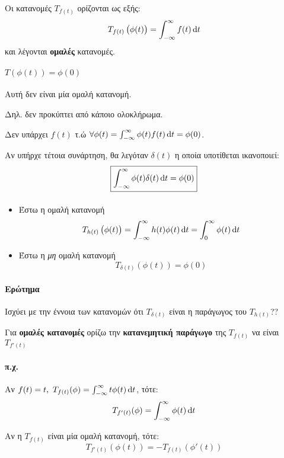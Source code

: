 \documentclass[11pt,a4paper,titlepage,final]{article}
\begin{document}
\begin{defn}{}{}
Οι κατανομές \( T_{f(t)} \) ορίζονται ως εξής:
\[
T_{f(t)}\left( \phi(t) \right) = \int_{-\infty}^\infty f(t) \dif t
\]
και λέγονται \textbf{ομαλές} κατανομές.
\end{defn}
\paragraph{\( T\left( \phi(t) \right) = \phi(0) \)}
Αυτή δεν είναι μία ομαλή κατανομή.

Δηλ. δεν προκύπτει από κάποιο ολοκλήρωμα.

Δεν υπάρχει \( f(t) \) τ.ώ \( \forall \phi(t) = \int_{-\infty}^\infty \phi(t)f(t)\dif t =\phi(0) \).

Αν υπήρχε τέτοια συνάρτηση, θα λεγόταν \( \delta(t) \) η οποία υποτίθεται ικανοποιεί:
\[
\boxed{
\int_{-\infty}^\infty \phi(t)\delta(t)\dif t = \phi(0)
}
\]

\paragraph{}

\begin{itemize}
\item Έστω η ομαλή κατανομή \[
T_{h(t)}\left(\phi(t) \right)  = \int_{-\infty}^\infty h(t)\phi(t)\dif t = \int_0^\infty \phi(t)\dif t
\]
\item Έστω η \textit{μη} ομαλή κατανομή \[
T_{\delta(t)} \left(\phi(t) \right) = \phi(0)
\]
\end{itemize}
\paragraph{Ερώτημα} Ισχύει με την έννοια των κατανομών ότι \( T_{\delta(t)} \) είναι η παράγωγος του \( T_{h(t)} \)??

\begin{defn}{}{}
Για \textbf{ομαλές κατανομές} ορίζω την \textbf{κατανεμητική παράγωγο} της \( T_{f(t)} \) να είναι \( T_{f'(t)} \)
\end{defn}
\paragraph{π.χ.} Αν \( f(t)=t,\ T_{f(t)}(\phi) = \int_{-\infty}^\infty t\phi(t)\dif t \), τότε:
\[
T_{f'(t)}(\phi) = \int_{-\infty}^\infty \phi(t)\dif t
\]

\begin{theorem}{}{}
Αν η \( T_{f(t)} \) είναι μία ομαλή κατανομή, τότε:
\[
T_{f'(t)}\left(\phi(t)\right) = -T_{f(t)}\left(\phi'(t) \right)
\]
\end{theorem}
\end{document}
